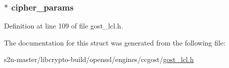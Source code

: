 \subsubsection[{\texorpdfstring{cipher\+\_\+params}{cipher_params}}]{$\ast$ cipher\+\_\+params}\hypertarget{struct_g_o_s_t___k_e_y___p_a_r_a_m_s_a8c35d15992e4e774f5c319ed0725b440}{}\label{struct_g_o_s_t___k_e_y___p_a_r_a_m_s_a8c35d15992e4e774f5c319ed0725b440}


Definition at line 109 of file gost\+\_\+lcl.\+h.



The documentation for this struct was generated from the following file\+:\begin{DoxyCompactItemize}
\item 
s2n-\/master/libcrypto-\/build/openssl/engines/ccgost/\hyperlink{gost__lcl_8h}{gost\+\_\+lcl.\+h}\end{DoxyCompactItemize}
